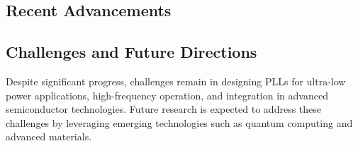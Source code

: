 \subsection{Recent Advancements}

\subsection{Challenges and Future Directions}
Despite significant progress, challenges remain in designing PLLs for ultra-low power applications, high-frequency operation, and integration in advanced semiconductor technologies. Future research is expected to address these challenges by leveraging emerging technologies such as quantum computing and advanced materials.

% 
% 